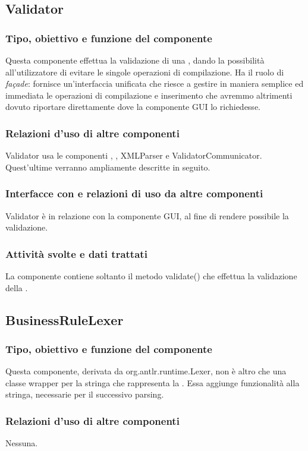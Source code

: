 \documentclass[11pt,titlepage,a4paper]{report}
\begin{document}
\subsection{Validator}%
\subsubsection{Tipo, obiettivo e funzione del componente}
Questa componente effettua la validazione di una \br, dando la possibilit\`a all'utilizzatore di evitare le singole operazioni di compilazione. Ha il ruolo di \textit{fa\c{c}ade}: fornisce un'interfaccia unificata che riesce a gestire in maniera semplice ed immediata le operazioni di compilazione e inserimento che avremmo altrimenti dovuto riportare direttamente dove la componente GUI lo richiedesse.
\subsubsection{Relazioni d'uso di altre componenti}
Validator usa le componenti \brp, \brl, XMLParser e ValidatorCommunicator. Quest'ultime verranno ampliamente descritte in seguito.
\subsubsection{Interfacce con e relazioni di uso da altre componenti}
Validator \`e in relazione con la componente GUI, al fine di rendere possibile la validazione.
\subsubsection{Attivit\`a svolte e dati trattati}
La componente contiene soltanto il metodo validate() che effettua la validazione della \br.

\subsection{BusinessRuleLexer}
\subsubsection{Tipo, obiettivo e funzione del componente}
Questa componente, derivata da org.antlr.runtime.Lexer, non \`e altro che una classe wrapper per la stringa che rappresenta la \br. Essa aggiunge funzionalit\`a alla stringa, necessarie per il successivo parsing.
\subsubsection{Relazioni d'uso di altre componenti}
Nessuna.
\end{document}
